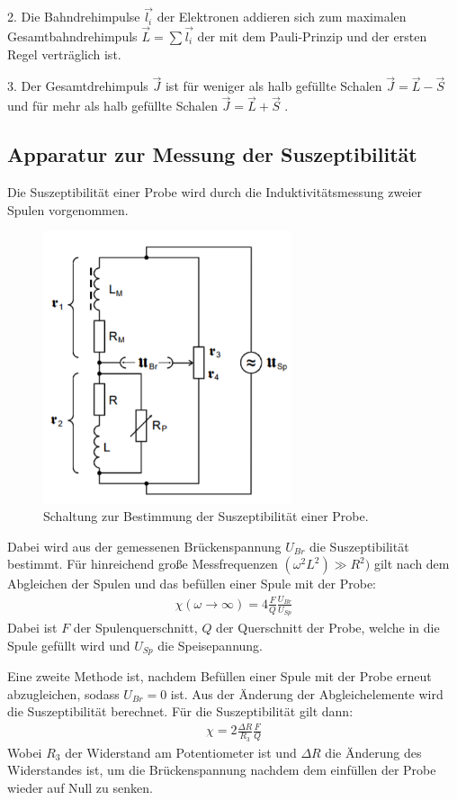 2. Die Bahndrehimpulse $\vec{l_i}$ der Elektronen addieren sich zum maximalen Gesamtbahndrehimpuls $\vec{L} = \sum \vec{l_i}$ der mit
dem Pauli-Prinzip und der ersten Regel verträglich ist.

3. Der Gesamtdrehimpuls $\vec{J}$ ist für weniger als halb gefüllte Schalen $\vec{J} = \vec{L}- \vec{S}$ und für mehr als halb gefüllte Schalen
$\vec{J} = \vec{L} + \vec{S}$ .


\subsection{Apparatur zur Messung der Suszeptibilität}
Die Suszeptibilität einer Probe wird durch die Induktivitätsmessung zweier Spulen vorgenommen.

\begin{figure}[H]
  \centering
  \includegraphics[height=8cm]{brueckenschaltung.PNG}
  \caption{Schaltung zur Bestimmung der Suszeptibilität einer Probe. \cite{sample}}
  \label{fig:bruecke}
\end{figure}

Dabei wird aus der gemessenen Brückenspannung $U_{Br}$ die Suszeptibilität bestimmt. Für hinreichend große Messfrequenzen
$(\omega^2 L^2) \gg R^2)$ gilt nach dem Abgleichen der Spulen und das befüllen einer Spule mit der Probe:
\begin{align}
  \chi(\omega \rightarrow \infty) = 4 \frac{F}{Q} \frac{U_{Br}}{U_{Sp}}
\end{align}
Dabei ist $F$ der Spulenquerschnitt, $Q$ der Querschnitt der Probe, welche in die Spule gefüllt wird und $U_{Sp}$ die
Speisepannung.

Eine zweite Methode ist, nachdem Befüllen einer Spule mit der Probe erneut abzugleichen, sodass $U_{Br} = 0$ ist. Aus
der Änderung der Abgleichelemente wird die Suszeptibilität berechnet. Für die Suszeptibilität gilt dann:
\begin{align}
  \chi = 2 \frac{\Delta R}{R_3} \frac{F}{Q}
\end{align}
Wobei $R_3$ der Widerstand am Potentiometer ist und $\Delta R$ die Änderung des Widerstandes ist, um die
Brückenspannung nachdem dem einfüllen der Probe wieder auf Null zu senken.

